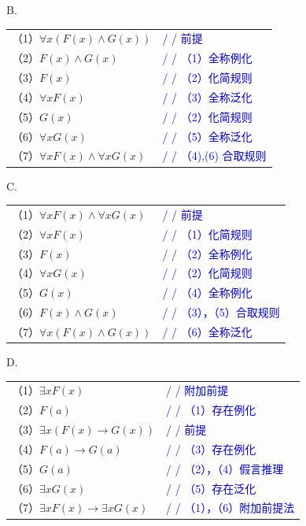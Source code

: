\documentclass[UTF8, heading=true]{ctexart}
\begin{document}
B.

\begin{tabular}{ll}
  （1）$\forall x(F(x) \wedge G(x))$ & \textcolor{blue}{/ / 前提} \\
  （2）$F(x) \wedge G(x)$ & \textcolor{blue}{/ / （1）全称例化} \\
  （3）$F(x)$ & \textcolor{blue}{/ / （2）化简规则} \\
  （4）$\forall x F(x)$ & \textcolor{blue}{/ / （3）全称泛化} \\
  （5）$G(x)$ & \textcolor{blue}{/ / （2）化简规则} \\
  （6）$\forall x G(x)$ & \textcolor{blue}{/ / （5）全称泛化} \\
  （7）$\forall x F(x) \wedge \forall x G(x)$ & \textcolor{blue}{/ / （4),(6) 合取规则}
  \end{tabular}

C.

\begin{tabular}{ll}
  （1）$\forall x F(x) \wedge \forall x G(x)$ & \textcolor{blue}{/ / 前提} \\
  （2）$\forall x F(x)$ & \textcolor{blue}{/ / （1）化简规则} \\
  （3）$F(x)$ & \textcolor{blue}{/ / （2）全称例化} \\
  （4）$\forall x G(x)$ & \textcolor{blue}{/ / （2）化简规则} \\
  （5）$G(x)$ & \textcolor{blue}{/ / （4）全称例化} \\
  （6）$F(x) \wedge G(x)$ & \textcolor{blue}{/ / （3），（5）合取规则} \\
  （7）$\forall x(F(x) \wedge G(x))$ & \textcolor{blue}{/ / （6）全称泛化}
\end{tabular}

D.

\begin{tabular}{ll}
  （1）$\exists x F(x)$ & \textcolor{blue}{/ / 附加前提} \\
  （2）$F(a)$ & \textcolor{blue}{/ / （1）存在例化} \\
  （3）$\exists x(F(x) \rightarrow G(x))$ & \textcolor{blue}{/ / 前提} \\
  （4）$F(a) \rightarrow G(a)$ & \textcolor{blue}{/ / （3）存在例化} \\
  （5）$G(a)$ & \textcolor{blue}{/ / （2），（4）假言推理} \\
  （6）$\exists x G(x)$ & \textcolor{blue}{/ / （5）存在泛化} \\
  （7）$\exists x F(x) \rightarrow \exists x G(x)$ & \textcolor{blue}{/ / （1），（6）附加前提法}
\end{tabular}
\end{document}
